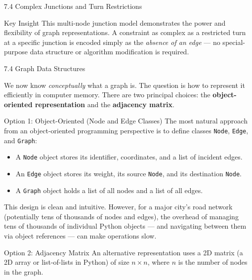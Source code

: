 \documentclass[aspectratio=169,10pt]{beamer}
\begin{document}
\begin{frame}[allowframebreaks]{7.4 Complex Junctions and Turn Restrictions}
  \begin{alertblock}{Key Insight}
    This multi-node junction model demonstrates the power and
    flexibility of graph representations.  A constraint as complex
    as a restricted turn at a specific junction is encoded simply
    as the \emph{absence of an edge} --- no special-purpose data
    structure or algorithm modification is required.
  \end{alertblock}

\end{frame}

\begin{frame}[allowframebreaks]{7.4 Graph Data Structures}

  We now know \emph{conceptually} what a graph is.  The question is
  how to represent it efficiently in computer memory.  There are two
  principal choices: the \textbf{object-oriented representation} and
  the \textbf{adjacency matrix}.

  \begin{block}{Option 1: Object-Oriented (Node and Edge Classes)}
    The most natural approach from an object-oriented programming
    perspective is to define classes \texttt{Node}, \texttt{Edge},
    and \texttt{Graph}:
    \begin{itemize}
      \item A \texttt{Node} object stores its identifier, coordinates,
            and a list of incident edges.
      \item An \texttt{Edge} object stores its weight, its source
            \texttt{Node}, and its destination \texttt{Node}.
      \item A \texttt{Graph} object holds a list of all nodes and a
            list of all edges.
    \end{itemize}
    This design is clean and intuitive.  However, for a major city's
    road network (potentially tens of thousands of nodes and edges),
    the overhead of managing tens of thousands of individual Python
    objects --- and navigating between them via object references ---
    can make operations slow.
  \end{block}

  \framebreak

  \begin{block}{Option 2: Adjacency Matrix}
    An alternative representation uses a 2D matrix (a 2D array or
    list-of-lists in Python) of size $n \times n$, where $n$ is the
    number of nodes in the graph.


\end{block}
\end{frame}
\end{document}
